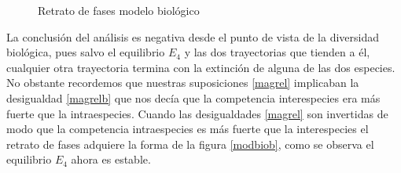\begin{figure}[h]
\begin{center}
\begin {pspicture}







\end{pspicture}
\end{center}
\caption{Retrato de fases modelo biológico}\label{modbio}
\end{figure}

La conclusión del análisis es negativa desde el punto de vista de
la diversidad biológica, pues salvo el equilibrio $E_4$ y las dos
trayectorias que tienden a él, cualquier otra trayectoria termina
con la extinción de alguna de las dos especies. No obstante
recordemos que nuestras suposiciones \eqref{magrel} implicaban la
desigualdad \eqref{magrelb} que nos decía que la competencia
interespecies era más fuerte que la intraespecies. Cuando las
desigualdades \eqref{magrel} son invertidas de modo que la
competencia intraespecies es más fuerte que la interespecies el
retrato de fases adquiere la forma de la figura \ref{modbiob},
como se observa el equilibrio $E_4$ ahora es estable.
